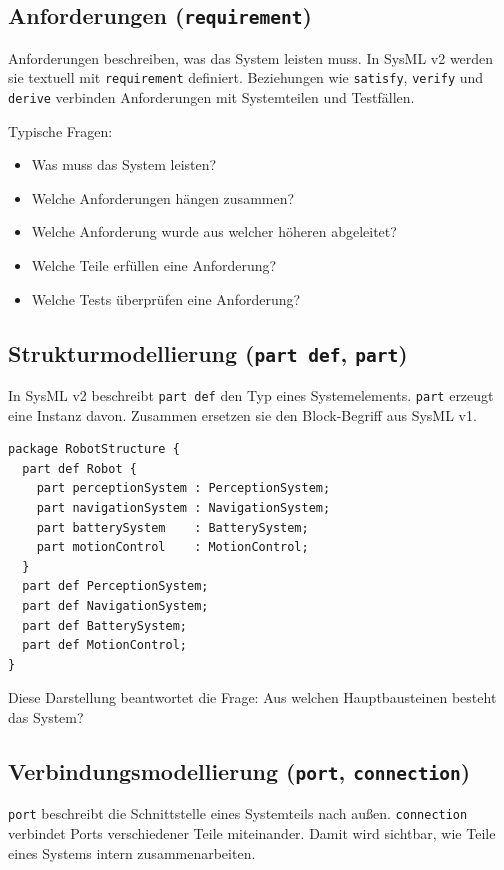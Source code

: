 \subsection{Anforderungen (\texttt{requirement})}
Anforderungen beschreiben, was das System leisten muss. In SysML v2 werden sie textuell mit \texttt{requirement} definiert. Beziehungen wie \texttt{satisfy}, \texttt{verify} und \texttt{derive} verbinden Anforderungen mit Systemteilen und Testfällen.

Typische Fragen:

\begin{itemize}
    \item Was muss das System leisten?
    \item Welche Anforderungen hängen zusammen?
    \item Welche Anforderung wurde aus welcher höheren abgeleitet?
    \item Welche Teile erfüllen eine Anforderung?
    \item Welche Tests überprüfen eine Anforderung?
\end{itemize}

\subsection{Strukturmodellierung (\texttt{part def}, \texttt{part})}
In SysML v2 beschreibt \texttt{part def} den Typ eines Systemelements. \texttt{part} erzeugt eine Instanz davon. Zusammen ersetzen sie den Block-Begriff aus SysML v1.

\begin{lstlisting}
package RobotStructure {
  part def Robot {
    part perceptionSystem : PerceptionSystem;
    part navigationSystem : NavigationSystem;
    part batterySystem    : BatterySystem;
    part motionControl    : MotionControl;
  }
  part def PerceptionSystem;
  part def NavigationSystem;
  part def BatterySystem;
  part def MotionControl;
}
\end{lstlisting}

Diese Darstellung beantwortet die Frage: Aus welchen Hauptbausteinen besteht das System?

\subsection{Verbindungsmodellierung (\texttt{port}, \texttt{connection})}
\texttt{port} beschreibt die Schnittstelle eines Systemteils nach außen. \texttt{connection} verbindet Ports verschiedener Teile miteinander. Damit wird sichtbar, wie Teile eines Systems intern zusammenarbeiten.

